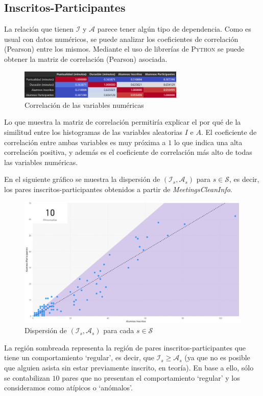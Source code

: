 \documentclass[11pt,a4paper]{book}
\theoremstyle{definition}%
\begin{document}
            \subsection{Inscritos-Participantes}
                La relación que tienen $\mathcal{I}$ y $\mathcal{A}$ parece tener algún tipo de dependencia. Como es usual con datos numéricos, se puede analizar los coeficientes de correlación (Pearson) entre los mismos. Mediante el uso de librerías de \textsc{Python} se puede obtener la matriz de correlación (Pearson) asociada.
                \begin{figure}[H]
                    \centering
                    \includegraphics[width=0.7\textwidth]{Sources/corrmatrix_NumericalFeatures.png}
                    \caption{Correlación de las variables numéricas}
                \end{figure}
                Lo que muestra la matriz de correlación permitiría explicar el por qué de la similitud entre los histogramas de las variables aleatorias $I$ e $A$. El coeficiente de correlación entre ambas variables es muy próxima a $1$ lo que indica una alta correlación positiva, y además es el coeficiente de correlación más alto de todas las variables numéricas.
                
                En el siguiente gráfico se muestra la dispersión de $(\mathcal{I}_s,\mathcal{A}_s)$ para $s\in\mathcal{S}$, es decir, los pares inscritos-participantes obtenidos a partir de \textit{MeetingsCleanInfo}.
                \begin{figure}[H]
                    \centering
                    \includegraphics[width=1\textwidth]{Sources/dispersion_InscritosParticipantes.png}
                    \caption{Dispersión de $(\mathcal{I}_s,\mathcal{A}_s)$ para cada $s\in\mathcal{S}$}
                    \label{fig:dispersion_InscritosParticipantes}
                \end{figure}
                La región sombreada representa la región de pares inscritos-participantes que tiene un comportamiento `regular', es decir, que $\mathcal{I}_s\geq \mathcal{A}_s$ (ya que no es posible que alguien asista sin estar previamente inscrito, en teoría). En base a ello, sólo se contabilizan $10$ pares que no presentan el comportamiento `regular' y los consideramos como atípicos o `anómalos'.
\end{document}
